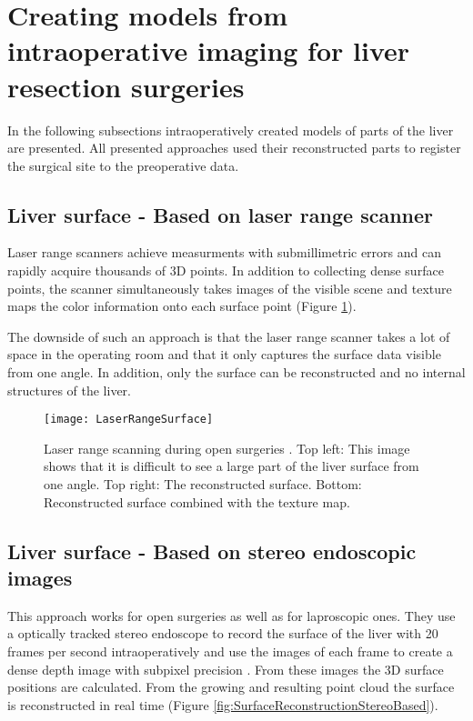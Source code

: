\section{Creating models from intraoperative imaging for liver resection
  surgeries}
In the following subsections intraoperatively created models of parts of the
liver are presented. All presented approaches used their reconstructed parts to
register the surgical site to the preoperative data.


\subsection{Liver surface - Based on laser range scanner}
Laser range scanners achieve measurments with submillimetric errors and can rapidly
acquire thousands of 3D points. In addition to collecting dense surface points,
the scanner simultaneously takes images of the visible scene and texture maps
the color information onto each surface point (Figure \ref{fig:LaserRangeSurface}). 

The downside of such an approach is that the laser range scanner takes a lot of
space in the operating room and that it only captures the surface data visible
from one angle. In addition, only the surface can be reconstructed and no
internal structures of the liver.
\begin{figure}[H]
  \centering
 \texttt{[image: LaserRangeSurface]}
 \caption{Laser range scanning during open surgeries \cite{cash2007concepts}.
   Top left: This image shows that it is difficult to see a large part of the liver
   surface from one angle. Top right: The reconstructed surface. Bottom:
   Reconstructed surface combined with the texture map. }
  \label{fig:LaserRangeSurface}
\end{figure}

\subsection{Liver surface - Based on stereo endoscopic images}
This approach works for open surgeries as well as for laproscopic ones. They use
a optically tracked stereo endoscope to record the surface of the liver with 20 frames per second intraoperatively and use
the images of each frame to create a dense depth image with subpixel precision \cite{speidel2011intraoperative}.
From these images the 3D surface positions are calculated. From the growing and resulting
point cloud the surface is reconstructed in real time (Figure \ref{fig:SurfaceReconstructionStereoBased}).


